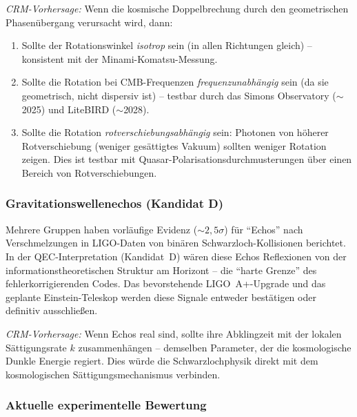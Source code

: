 \documentclass[11pt,a4paper]{article}
\begin{document}
\textit{CRM-Vorhersage:} Wenn die kosmische Doppelbrechung durch den geometrischen Phasen\"ubergang verursacht wird, dann:
\begin{enumerate}
\item Sollte der Rotationswinkel \textit{isotrop} sein (in allen Richtungen gleich) -- konsistent mit der Minami-Komatsu-Messung.
\item Sollte die Rotation bei CMB-Frequenzen \textit{frequenzunabh\"angig} sein (da sie geometrisch, nicht dispersiv ist) -- testbar durch das Simons Observatory ($\sim$2025) und LiteBIRD ($\sim$2028).
\item Sollte die Rotation \textit{rotverschiebungsabh\"angig} sein: Photonen von h\"oherer Rotverschiebung (weniger ges\"attigtes Vakuum) sollten weniger Rotation zeigen. Dies ist testbar mit Quasar-Polarisations\-durchmusterungen \"uber einen Bereich von Rotverschiebungen.
\end{enumerate}

\subsubsection{Gravitationswellenechos (Kandidat D)}

Mehrere Gruppen \cite{Abedi2017} haben vorl\"aufige Evidenz ($\sim2{,}5\sigma$) f\"ur "`Echos"' nach Verschmelzungen in LIGO-Daten von bin\"aren Schwarzloch-Kollisionen berichtet. In der QEC-Interpretation (Kandidat~D) w\"aren diese Echos Reflexionen von der informationstheoretischen Struktur am Horizont -- die "`harte Grenze"' des fehlerkorrigierenden Codes. Das bevorstehende LIGO~A+-Upgrade und das geplante Einstein-Teleskop werden diese Signale entweder best\"atigen oder definitiv ausschlie\ss en.

\textit{CRM-Vorhersage:} Wenn Echos real sind, sollte ihre Abklingzeit mit der lokalen S\"attigungsrate $k$ zusammenh\"angen -- demselben Parameter, der die kosmologische Dunkle Energie regiert. Dies w\"urde die Schwarzlochphysik direkt mit dem kosmologischen S\"attigungsmechanismus verbinden.

\subsubsection{Aktuelle experimentelle Bewertung}
\end{document}
